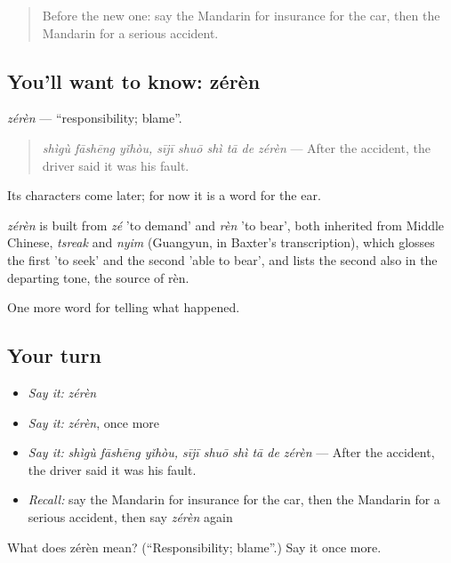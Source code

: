 \label{lesson:ZH-C297-zeren}



\begin{quote}
Before the new one: say the Mandarin for insurance for the car, then the Mandarin for a serious accident.
\end{quote}

\subsection*{You'll want to know: zérèn}
\emph{zérèn} — \textquotedblleft{}responsibility; blame\textquotedblright{}.

\begin{quote}
\emph{shìgù fāshēng yǐhòu, sījī shuō shì tā de zérèn} — After the accident, the driver said it was his fault.
\end{quote}

Its characters come later; for now it is a word for the ear.

\begin{cousinweb}
\emph{zérèn} is built from \emph{zé} 'to demand' and \emph{rèn} 'to bear', both inherited from Middle Chinese, \emph{tsreak} and \emph{nyim} (Guangyun, in Baxter's transcription), which glosses the first 'to seek' and the second 'able to bear', and lists the second also in the departing tone, the source of rèn.
\end{cousinweb}

\begin{grammarlens}[title={What you've built}]
One more word for telling what happened.
\end{grammarlens}

\subsection*{Your turn}
\begin{itemize}
\raggedright
  \item \emph{Say it:} \emph{zérèn}
  \item \emph{Say it:} \emph{zérèn}, once more
  \item \emph{Say it:} \emph{shìgù fāshēng yǐhòu, sījī shuō shì tā de zérèn} — After the accident, the driver said it was his fault.
  \item \emph{Recall:} say the Mandarin for insurance for the car, then the Mandarin for a serious accident, then say \emph{zérèn} again
\end{itemize}

\begin{tcolorbox}[breakable,colback=teal!4,colframe=teal!35!black,title={Before you move on}]
What does zérèn mean? (\textquotedblleft{}Responsibility; blame\textquotedblright{}.) Say it once more.
\end{tcolorbox}
